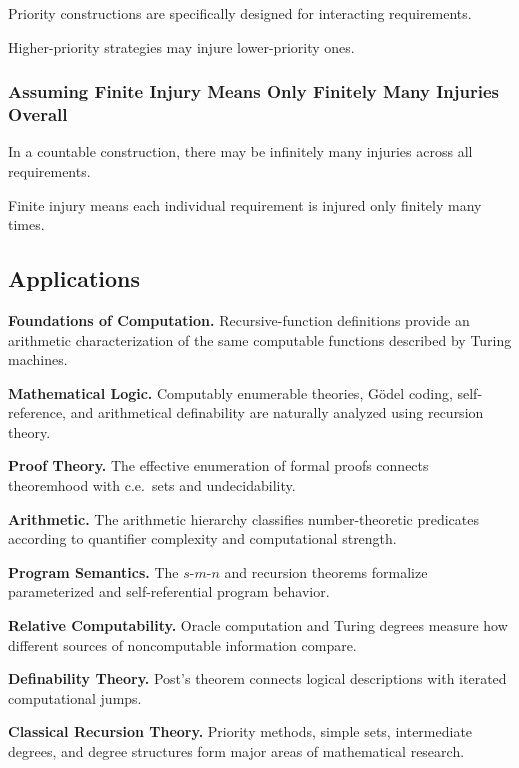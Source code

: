 Priority constructions are specifically designed for interacting
requirements.

Higher-priority strategies may injure lower-priority ones.

\subsubsection{Assuming Finite Injury Means Only Finitely Many Injuries Overall}

In a countable construction, there may be infinitely many injuries across
all requirements.

Finite injury means each individual requirement is injured only finitely
many times.

\subsection{Applications}
\label{subsec:recursion-theory-applications}

\begin{applicationbox}

\textbf{Foundations of Computation.}
Recursive-function definitions provide an arithmetic characterization of
the same computable functions described by Turing machines.

\medskip

\textbf{Mathematical Logic.}
Computably enumerable theories, Gödel coding, self-reference, and
arithmetical definability are naturally analyzed using recursion theory.

\medskip

\textbf{Proof Theory.}
The effective enumeration of formal proofs connects theoremhood with c.e.\
sets and undecidability.

\medskip

\textbf{Arithmetic.}
The arithmetic hierarchy classifies number-theoretic predicates according
to quantifier complexity and computational strength.

\medskip

\textbf{Program Semantics.}
The \(s\)-\(m\)-\(n\) and recursion theorems formalize parameterized and
self-referential program behavior.

\medskip

\textbf{Relative Computability.}
Oracle computation and Turing degrees measure how different sources of
noncomputable information compare.

\medskip

\textbf{Definability Theory.}
Post's theorem connects logical descriptions with iterated computational
jumps.

\medskip

\textbf{Classical Recursion Theory.}
Priority methods, simple sets, intermediate degrees, and degree structures
form major areas of mathematical research.

\end{applicationbox}

